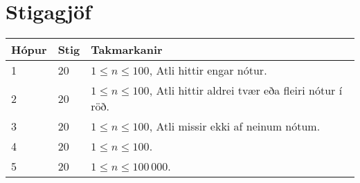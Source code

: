 \section*{Stigagjöf}
\begin{tabular}{|l|l|l|}
\hline
Hópur & Stig & Takmarkanir \\ \hline
1     & 20   & $1 \leq n \leq 100$, Atli hittir engar nótur. \\ \hline
2     & 20   & $1 \leq n \leq 100$, Atli hittir aldrei tvær eða fleiri nótur í röð. \\ \hline
3     & 20   & $1 \leq n \leq 100$, Atli missir ekki af neinum nótum. \\ \hline
4     & 20   & $1 \leq n \leq 100$. \\ \hline
5     & 20   & $1 \leq n \leq 100\,000$. \\ \hline
\end{tabular}
